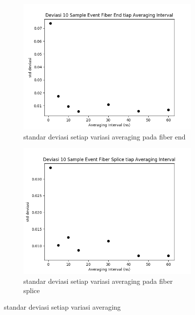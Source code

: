 \documentclass[12pt]{article}
\begin{document}
	\begin{figure}[!ht]
		\centering
		\captionsetup{justification=centering}
		\begin{subfigure}[b]{0.7\textwidth}
			\includegraphics[width=\textwidth]{images/Bab_4/stddev_avg_end}	
			\caption{\small{standar deviasi setiap variasi averaging pada fiber end}}		
		\end{subfigure}
		\begin{subfigure}[b]{0.7\textwidth}
			\includegraphics[width=\linewidth]{images/Bab_4/stddev_avg_splice}
			\caption{\small{standar deviasi setiap variasi averaging pada fiber splice}}			
		\end{subfigure}
		\caption[belum ada judul]{\small{standar deviasi setiap variasi averaging}}
	\end{figure}
\end{document}
